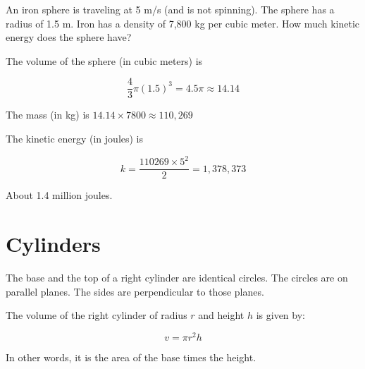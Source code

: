 \begin{Exercise}[title={Flying Sphere}, label=flying_sphere]

An iron sphere is traveling at 5 m/s (and is not spinning).  The
sphere has a radius of 1.5 m.  Iron has a density of 7,800 kg per
cubic meter.  How much kinetic energy does the sphere have?
\end{Exercise}
\begin{Answer}[ref=flying_sphere]
  The volume of the sphere (in cubic meters) is

  $$\frac{4}{3}\pi (1.5)^3 = 4.5 \pi \approx 14.14$$

  The mass (in kg) is $14.14 \times 7800 \approx 110,269$

  The kinetic energy (in joules) is

  $$k = \frac{110269 \times 5^2}{2} = 1,378,373$$

  About 1.4 million joules.
\end{Answer}

\section{Cylinders}

The base and the top of a right cylinder are identical circles. The
circles are on parallel planes.  The sides are perpendicular to those
planes.


\begin{mdframed}[style=important, frametitle={Volume of a cylinder}]


The volume of the right cylinder of radius $r$ and height
$h$ is given by:

$$v = \pi r^2 h$$

In other words, it is the area of the base times the height.

\end{mdframed}

